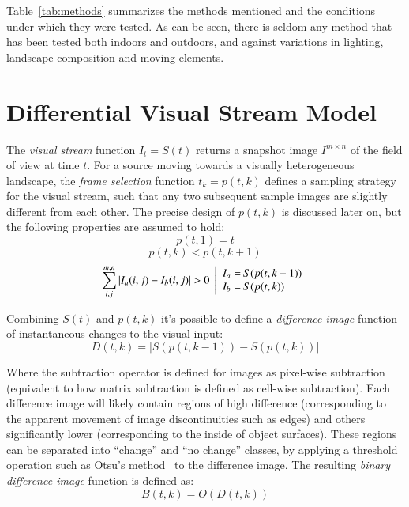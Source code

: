 \documentclass[twocolumn, 9pt,fleqn]{jsproceedings}
\begin{document}
Table~\ref{tab:methods} summarizes the methods mentioned and the conditions under which they were tested. As can be seen, there is seldom any method that has been tested both indoors and outdoors, and against variations in lighting, landscape composition and moving elements.

\section{Differential Visual Stream Model}

The \textit{visual stream} function $I_t = S(t)$ returns a snapshot image $I^{m \times n}$ of the field of view at time $t$. For a source moving towards a visually heterogeneous landscape, the \textit{frame selection} function $t_k = p(t, k)$ defines a sampling strategy for the visual stream, such that any two subsequent sample images are slightly different from each other. The precise design of $p(t, k)$ is discussed later on, but the following properties are assumed to hold:
\begin{equation}
p(t, 1) = t
\end{equation}
\begin{equation}
p(t, k) < p(t, k+1)
\end{equation}
\begin{equation}
\sum_{i, j}^{m, n}{|I_a(i, j) - I_b(i, j)|} > 0 \; \left|
\begin{array}{r@{\hspace{2bp}} l}
I_a = & S(p(t, k-1)) \\
I_b = & S(p(t, k))
\end{array}
\right.
\end{equation}

Combining $S(t)$ and $p(t, k)$ it's possible to define a \textit{difference image} function of instantaneous changes to the visual input:
\begin{equation}
D(t, k) = | S(p(t, k-1)) - S(p(t, k)) |
\end{equation}

Where the subtraction operator is defined for images as pixel-wise subtraction (equivalent to how matrix subtraction is defined as cell-wise subtraction). Each difference image will likely contain regions of high difference (corresponding to the apparent movement of image discontinuities such as edges) and others significantly lower (corresponding to the inside of object surfaces). These regions can be separated into ``change'' and ``no change'' classes, by applying a threshold operation such as Otsu's method~\cite{OTS79} to the difference image. The resulting \textit{binary difference image} function is defined as:
\begin{equation}
B(t, k) = O(D(t, k))
\end{equation}
\end{document}
